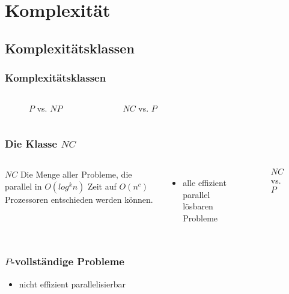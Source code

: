 \section{Komplexität}

\subsection{Komplexitätsklassen}
\begin{frame}
    \frametitle{Komplexitätsklassen}
    \begin{columns}
        \begin{figure}
            \centering
            
            \caption{$P$ vs. $NP$}
        \end{figure}
        \pause
        \begin{figure}
            \centering
            
            \caption{$NC$ vs. $P$}
        \end{figure}
    \end{columns}
\end{frame}

\begin{frame}
    \frametitle{Die Klasse $NC$}
    \begin{columns}
        \begin{block}{$NC$}
            Die Menge aller Probleme, die parallel
            in $O(log^k n)$ Zeit auf $O(n^c)$ Prozessoren entschieden werden können.
        \end{block}
        \begin{itemize}
            \item alle effizient parallel lösbaren Probleme
        \end{itemize}
        \begin{figure}
            \centering
            
            \caption{$NC$ vs. $P$}
        \end{figure}
    \end{columns}
\end{frame}

\begin{frame}
    \frametitle{$P$-vollständige Probleme}
    \begin{itemize}
        \item nicht effizient parallelisierbar
    \end{itemize}
\end{frame}
